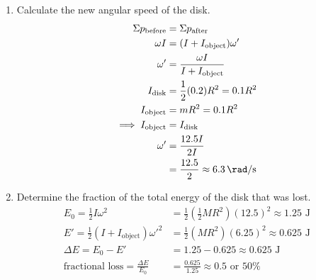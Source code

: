 \documentclass[a4paper,12pt]{article}
\begin{document}
\begin{enumerate}[label=(\alph*)]
        \begin{enumerate}[label=(\roman*)]
          \item Calculate the new angular speed of the disk.
                \begin{align*}
                  \Sigma p_\text{before}   & = \Sigma p_\text{after}                               \\
                  \omega I                 & = (I + I_\text{object})\omega'                        \\
                  \omega'                  & = \frac{\omega I}{I + I_\text{object}}                \\
                  I_\text{disk}            & = \frac{1}{2}(0.2)R^2       = 0.1R^2                  \\
                  I_\text{object}          & = mR^2                           = 0.1R^2             \\
                  \implies I_\text{object} & = I_\text{disk}                                       \\
                  \omega'                  & = \frac{12.5I}{2I}                                    \\
                                           & = \frac{12.5}{2}         \approx \SI{6.3}{\rad\per\s}
                \end{align*}
          \item Determine the fraction of the total energy of the disk that was lost.
                \begin{align*}
                  E_0 = \frac{1}{2}I\omega^2                     & = \frac{1}{2}\left(\frac{1}{2}MR^2\right)(12.5)^2 \approx 1.25 \text{ J}                          \\
                  E' = \frac{1}{2}(I + I_\text{object})\omega'^2 & = \frac{1}{2}\left(MR^2\right)(6.25)^2 \approx 0.625                                    \text{ J} \\
                  \Delta E = E_0 - E'                            & = 1.25 - 0.625 \approx 0.625 \text{ J}                                                            \\
                  \text{fractional loss} = \frac{\Delta E}{E_0}  & = \frac{0.625}{1.25} \approx 0.5 \text{ or } 50\%                                                 \\
                \end{align*}
        \end{enumerate}
\end{enumerate}
\end{document}
